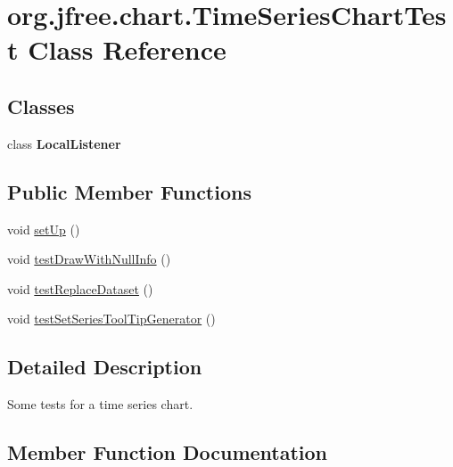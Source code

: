 \hypertarget{classorg_1_1jfree_1_1chart_1_1_time_series_chart_test}{}\section{org.\+jfree.\+chart.\+Time\+Series\+Chart\+Test Class Reference}
\label{classorg_1_1jfree_1_1chart_1_1_time_series_chart_test}
\subsection*{Classes}
\begin{DoxyCompactItemize}
\item 
class {\bfseries Local\+Listener}
\end{DoxyCompactItemize}
\subsection*{Public Member Functions}
\begin{DoxyCompactItemize}
\item 
void \mbox{\hyperlink{classorg_1_1jfree_1_1chart_1_1_time_series_chart_test_ac18096355f5303b4da411158e4a11de4}{set\+Up}} ()
\item 
void \mbox{\hyperlink{classorg_1_1jfree_1_1chart_1_1_time_series_chart_test_a0f71bea6125c9dbc13b4fa7738b8c4dc}{test\+Draw\+With\+Null\+Info}} ()
\item 
void \mbox{\hyperlink{classorg_1_1jfree_1_1chart_1_1_time_series_chart_test_aaaf046345322b48873a934f03a97f116}{test\+Replace\+Dataset}} ()
\item 
void \mbox{\hyperlink{classorg_1_1jfree_1_1chart_1_1_time_series_chart_test_ab331bff380903e83384851eac78ee918}{test\+Set\+Series\+Tool\+Tip\+Generator}} ()
\end{DoxyCompactItemize}


\subsection{Detailed Description}
Some tests for a time series chart. 

\subsection{Member Function Documentation}
\mbox{\label{classorg_1_1jfree_1_1chart_1_1_time_series_chart_test_ac18096355f5303b4da411158e4a11de4}} 
